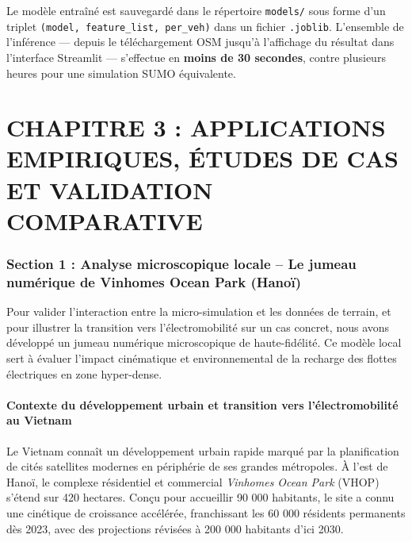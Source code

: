 \documentclass[10pt, a4paper]{article}
\begin{document}
Le modèle entraîné est sauvegardé dans le répertoire \texttt{models/}
sous forme d'un triplet
\texttt{(model,\ feature\_list,\ \textquotesingle{}per\_veh\textquotesingle{})}
dans un fichier \texttt{.joblib}. L'ensemble de l'inférence --- depuis
le téléchargement OSM jusqu'à l'affichage du résultat dans l'interface
Streamlit --- s'effectue en \textbf{moins de 30 secondes}, contre
plusieurs heures pour une simulation SUMO équivalente.

\newpage

\section{CHAPITRE 3 : APPLICATIONS EMPIRIQUES, ÉTUDES DE CAS ET
VALIDATION
COMPARATIVE}\label{chapitre-3-applications-empiriques-uxe9tudes-de-cas-et-validation-comparative}

\subsubsection{Section 1 : Analyse microscopique locale -- Le jumeau
numérique de Vinhomes Ocean Park
(Hanoï)}\label{section-1-analyse-microscopique-locale-le-jumeau-numuxe9rique-de-vinhomes-ocean-park-hanouxef}

Pour valider l'interaction entre la micro-simulation et les données de
terrain, et pour illustrer la transition vers l'électromobilité sur un
cas concret, nous avons développé un jumeau numérique microscopique de
haute-fidélité. Ce modèle local sert à évaluer l'impact cinématique et
environnemental de la recharge des flottes électriques en zone
hyper-dense.

\paragraph{Contexte du développement urbain et transition vers
l'électromobilité au
Vietnam}\label{contexte-du-duxe9veloppement-urbain-et-transition-vers-luxe9lectromobilituxe9-au-vietnam}

Le Vietnam connaît un développement urbain rapide marqué par la
planification de cités satellites modernes en périphérie de ses grandes
métropoles. À l'est de Hanoï, le complexe résidentiel et commercial
\emph{Vinhomes Ocean Park} (VHOP) s'étend sur 420 hectares. Conçu pour
accueillir 90 000 habitants, le site a connu une cinétique de croissance
accélérée, franchissant les 60 000 résidents permanents dès 2023, avec
des projections révisées à 200 000 habitants d'ici 2030.
\end{document}
